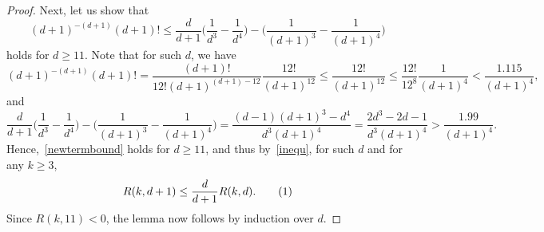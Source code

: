 \documentclass[a4paper, oneside, 11pt]{amsart}
\newcommand\numberthis{\addtocounter{equation}{1}\tag{\theequation}}
\theoremstyle{definition}
\newcommand{\1}{\mathbbm{1}}
\newcommand{\0}{\mathbf{o}}
\numberwithin{equation}{section}
\begin{document}
\begin{proof}
    Next, let us show that
    \begin{equation}\label{newtermbound} 
        (d+1)^{-(d+1)} (d+1)! \leq \frac{d}{d+1} \big( \frac{1}{d^3}-\frac{1}{d^4} \big) - \Big( \frac{1}{(d+1)^3} - \frac{1}{(d+1)^4} \Big) 
    \end{equation}
    holds for $d \geq 11$. Note that for such $d$, we have
    \[ 
        (d+1)^{-(d+1)} (d+1)! = \frac{(d+1)!}{12!(d+1)^{(d+1)-12}}\frac{12!}{(d+1)^{12}}\leq \frac{12!}{(d+1)^{12}} \leq \frac{12!}{12^8} \frac{1}{(d+1)^4} < \frac{1.115}{(d+1)^4}, 
    \]
    and
    \[ 
        \frac{d}{d+1} \Big( \frac{1}{d^3}-\frac{1}{d^4} \Big) - \Big( \frac{1}{(d+1)^3} - \frac{1}{(d+1)^4} \Big) = \frac{(d-1)(d+1)^3-d^4}{d^3(d+1)^4} = \frac{2d^3-2d-1}{d^3(d+1)^4} > \frac{1.99}{(d+1)^4}.
    \]
    Hence,~\eqref{newtermbound} holds for $d \geq 11$, and thus by~\eqref{inequ}, for such $d$ and for any $k\geq 3$,
    \[ 
        R(k,d+1) \leq \frac{d}{d+1} R(k,d). \numberthis\label{goodbound}
    \]
    Since $R(k,11) < 0$, the lemma now follows by induction over $d$.
\end{proof}
\end{document}

